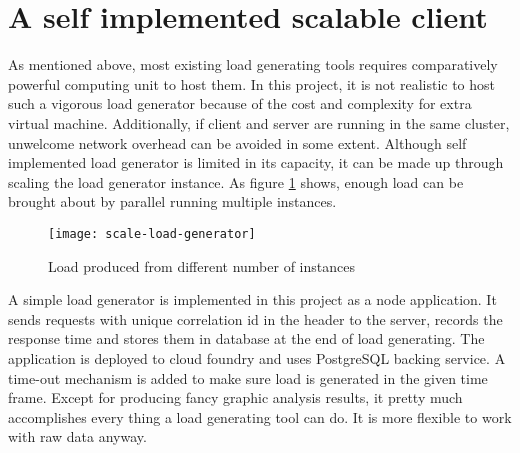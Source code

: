 \section{A self implemented scalable client}
	\label{scale-load-generator}
As mentioned above, most existing load generating tools requires comparatively powerful computing unit to host them. In this project, it is not realistic to host such a vigorous load generator because of the cost and complexity for extra virtual machine. Additionally, if client and server are running in the same cluster, unwelcome network overhead can be avoided in some extent. Although self implemented load generator is limited in its capacity, it can be made up through scaling the load generator instance. As figure  \ref{scale-load-generator} shows, enough load can be brought about by parallel running multiple instances.
\begin{figure}[h]
	\centering
	\texttt{[image: scale-load-generator]}
	\caption{Load produced from different number of instances}
	\label{scale-load-generator}
\end{figure}


A simple load generator is implemented in this project as a node application. It sends requests with unique correlation id in the header to the server, records the response time and stores them in database at the end of load generating. The application is deployed to cloud foundry and uses PostgreSQL backing service. A time-out mechanism is added to make sure load is generated in the given time frame. Except for producing fancy graphic analysis results, it pretty much accomplishes every thing a load generating tool can do. It is more flexible to work with raw data anyway.


